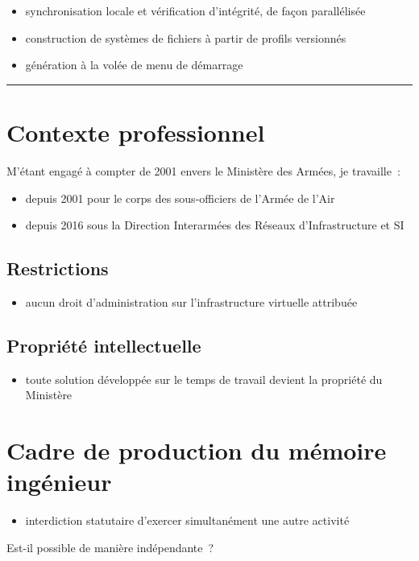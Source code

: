 \documentclass[12pt]{article}
\newcommand{\hr}{\rule{\textwidth}{1pt}}
\newenvironment{itmz}{\begin{itemize}
\setlength{\itemsep}{0em}
}{\end{itemize}}
\begin{document}
\begin{itmz}
\item{synchronisation locale et vérification d’intégrité, de façon parallélisée}
\item{construction de systèmes de fichiers à partir de profils versionnés}
\item{génération à la volée de menu de démarrage}
\end{itmz}

\hr

\appendix

\section{Contexte professionnel}

M’étant engagé à compter de 2001 envers le Ministère des Armées, je travaille :
\begin{itmz}
\item{depuis 2001 pour le corps des sous-officiers de l’Armée de l’Air}
\item{depuis 2016 sous la Direction Interarmées des Réseaux d’Infrastructure et SI}
\end{itmz}

\subsection{Restrictions}

\begin{itmz}
\item{aucun droit d’administration sur l’infrastructure virtuelle attribuée}
\end{itmz}

\subsection{Propriété intellectuelle}

\begin{itmz}
\item{toute solution développée sur le temps de travail devient la propriété du Ministère}
\end{itmz}

\section{Cadre de production du mémoire ingénieur}

\begin{itmz}
\item{interdiction statutaire d’exercer simultanément une autre activité}
\end{itmz}
Est-il possible de manière indépendante ?
\end{document}
